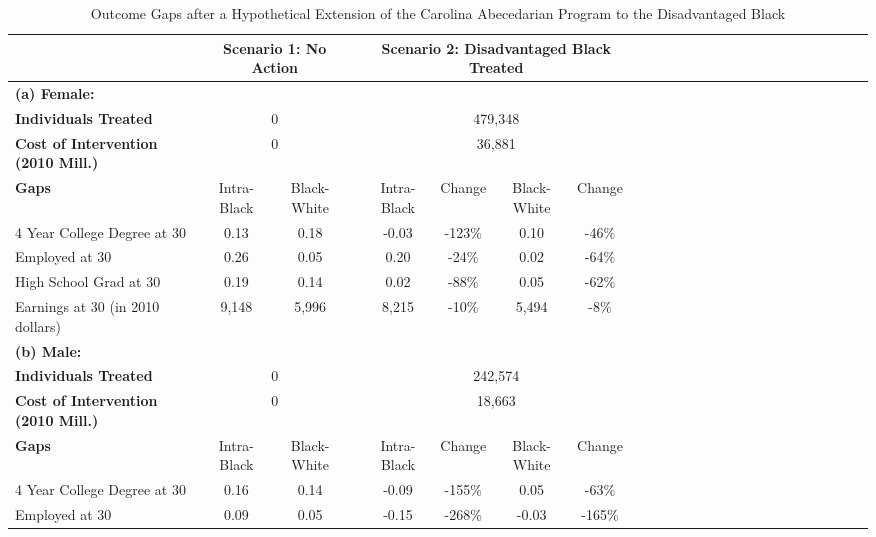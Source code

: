 \begin{table}[htbp]
\caption{\label{tab:tabp_abc} Outcome Gaps after a Hypothetical Extension of the Carolina Abecedarian Program to the Disadvantaged Black}\medskip
\footnotesize  \begin{center} \begin{tabular}{lcccccccccccccccccccccccc}  \hline \hline    
&\multicolumn{2}{c}{Scenario 1: No Action} &\multicolumn{6}{c}{Scenario 2: Disadvantaged Black Treated}  \\[0.05cm] \hline
 \textbf{(a) Female:} & \multicolumn{2}{c}{}   &  &\multicolumn{4}{c}{}   \\[0.02cm] 
\textbf{Individuals Treated} &\multicolumn{2}{c}{ 0 } &
 &\multicolumn{4}{c}{     479,348} &
 \\[0.2cm]  
\textbf{Cost of Intervention (2010 Mill.)} &\multicolumn{2}{c}{ 0 } &
 &\multicolumn{4}{c}{      36,881} &
 \\[0.2cm]  
\textbf{Gaps}&Intra-Black &Black-White & &Intra-Black &Change &Black-White &Change  \\[0.02cm] 
\hline
4 Year College Degree at 30 &        0.13&        0.18&&       -0.03&        -123\% &        0.10&         -46\% &
 \\[0.2cm]  
Employed at 30 &        0.26&        0.05&&        0.20&         -24\% &        0.02&         -64\% &
 \\[0.2cm]  
High School Grad at 30 &        0.19&        0.14&&        0.02&         -88\% &        0.05&         -62\% &
 \\[0.2cm]  
Earnings at 30 (in 2010 dollars) &       9,148&       5,996&&       8,215&         -10\% &       5,494&          -8\% &
 \\[0.2cm]  
\hline
 \textbf{(b) Male:} & \multicolumn{2}{c}{}   &  &\multicolumn{4}{c}{}   \\[0.02cm] 
\textbf{Individuals Treated} &\multicolumn{2}{c}{ 0 } &
 &\multicolumn{4}{c}{     242,574} &
 \\[0.2cm]  
\textbf{Cost of Intervention (2010 Mill.)} &\multicolumn{2}{c}{ 0 } &
 &\multicolumn{4}{c}{      18,663} &
 \\[0.2cm]  
\textbf{Gaps}&Intra-Black &Black-White & &Intra-Black &Change &Black-White &Change  \\[0.02cm] 
\hline
4 Year College Degree at 30 &        0.16&        0.14&&       -0.09&        -155\% &        0.05&         -63\% &
 \\[0.2cm]  
Employed at 30 &        0.09&        0.05&&       -0.15&        -268\% &       -0.03&        -165\% &

\end{tabular}
\end{center}
\end{table}
